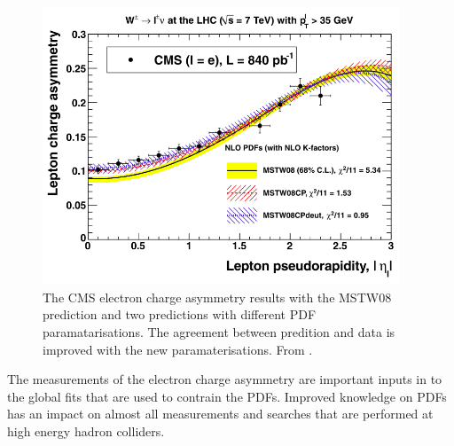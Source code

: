 \begin{figure}[htbp]
  \begin{center}
  \includegraphics*[width=0.95\textwidth]{viewer}
  \caption{The CMS electron charge asymmetry results with the MSTW08 prediction
and two predictions with different PDF paramatarisations. The agreement between
predition and data is improved with the new paramaterisations.
From \cite{martin2013extended}.  } \label{fig:mstwimprovement}
  \end{center}
\end{figure}

The measurements of the electron charge asymmetry are important inputs in to
the global fits that are used to contrain the PDFs. Improved knowledge on PDFs
has an impact on almost all measurements and searches that are performed at high
energy hadron colliders.

